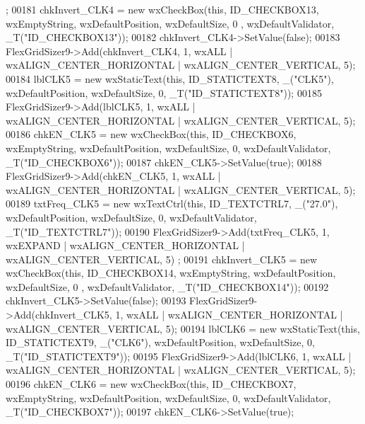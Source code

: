 \begin{DoxyCode}
      ;
00181     chkInvert\_CLK4 = \textcolor{keyword}{new} wxCheckBox(\textcolor{keyword}{this}, ID\_CHECKBOX13, wxEmptyString, wxDefaultPosition, wxDefaultSize, 0
      , wxDefaultValidator, _T(\textcolor{stringliteral}{"ID\_CHECKBOX13"}));
00182     chkInvert\_CLK4->SetValue(\textcolor{keyword}{false});
00183     FlexGridSizer9->Add(chkInvert\_CLK4, 1, wxALL | wxALIGN\_CENTER\_HORIZONTAL | wxALIGN\_CENTER\_VERTICAL, 5);
00184     lblCLK5 = \textcolor{keyword}{new} wxStaticText(\textcolor{keyword}{this}, ID\_STATICTEXT8, \_(\textcolor{stringliteral}{"CLK5"}), wxDefaultPosition, wxDefaultSize, 0, 
      _T(\textcolor{stringliteral}{"ID\_STATICTEXT8"}));
00185     FlexGridSizer9->Add(lblCLK5, 1, wxALL | wxALIGN\_CENTER\_HORIZONTAL | wxALIGN\_CENTER\_VERTICAL, 5);
00186     chkEN\_CLK5 = \textcolor{keyword}{new} wxCheckBox(\textcolor{keyword}{this}, ID\_CHECKBOX6, wxEmptyString, wxDefaultPosition, wxDefaultSize, 0, 
      wxDefaultValidator, _T(\textcolor{stringliteral}{"ID\_CHECKBOX6"}));
00187     chkEN\_CLK5->SetValue(\textcolor{keyword}{true});
00188     FlexGridSizer9->Add(chkEN\_CLK5, 1, wxALL | wxALIGN\_CENTER\_HORIZONTAL | wxALIGN\_CENTER\_VERTICAL, 5);
00189     txtFreq\_CLK5 = \textcolor{keyword}{new} wxTextCtrl(\textcolor{keyword}{this}, ID\_TEXTCTRL7, \_(\textcolor{stringliteral}{"27.0"}), wxDefaultPosition, wxDefaultSize, 0, 
      wxDefaultValidator, _T(\textcolor{stringliteral}{"ID\_TEXTCTRL7"}));
00190     FlexGridSizer9->Add(txtFreq\_CLK5, 1, wxEXPAND | wxALIGN\_CENTER\_HORIZONTAL | wxALIGN\_CENTER\_VERTICAL, 5)
      ;
00191     chkInvert\_CLK5 = \textcolor{keyword}{new} wxCheckBox(\textcolor{keyword}{this}, ID\_CHECKBOX14, wxEmptyString, wxDefaultPosition, wxDefaultSize, 0
      , wxDefaultValidator, _T(\textcolor{stringliteral}{"ID\_CHECKBOX14"}));
00192     chkInvert\_CLK5->SetValue(\textcolor{keyword}{false});
00193     FlexGridSizer9->Add(chkInvert\_CLK5, 1, wxALL | wxALIGN\_CENTER\_HORIZONTAL | wxALIGN\_CENTER\_VERTICAL, 5);
00194     lblCLK6 = \textcolor{keyword}{new} wxStaticText(\textcolor{keyword}{this}, ID\_STATICTEXT9, \_(\textcolor{stringliteral}{"CLK6"}), wxDefaultPosition, wxDefaultSize, 0, 
      _T(\textcolor{stringliteral}{"ID\_STATICTEXT9"}));
00195     FlexGridSizer9->Add(lblCLK6, 1, wxALL | wxALIGN\_CENTER\_HORIZONTAL | wxALIGN\_CENTER\_VERTICAL, 5);
00196     chkEN\_CLK6 = \textcolor{keyword}{new} wxCheckBox(\textcolor{keyword}{this}, ID\_CHECKBOX7, wxEmptyString, wxDefaultPosition, wxDefaultSize, 0, 
      wxDefaultValidator, _T(\textcolor{stringliteral}{"ID\_CHECKBOX7"}));
00197     chkEN\_CLK6->SetValue(\textcolor{keyword}{true});

\end{DoxyCode}
